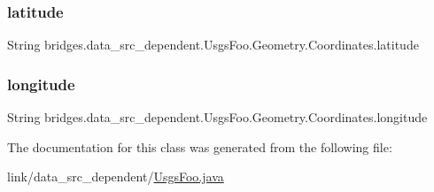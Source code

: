 \hypertarget{classbridges_1_1data__src__dependent_1_1_usgs_foo_1_1_geometry_1_1_coordinates_a8ab648886a19cd5d07f330e1558b8175}{}\label{classbridges_1_1data__src__dependent_1_1_usgs_foo_1_1_geometry_1_1_coordinates_a8ab648886a19cd5d07f330e1558b8175} 
\subsubsection{\texorpdfstring{latitude}{latitude}}
{\footnotesize\ttfamily String bridges.\+data\+\_\+src\+\_\+dependent.\+Usgs\+Foo.\+Geometry.\+Coordinates.\+latitude}

\hypertarget{classbridges_1_1data__src__dependent_1_1_usgs_foo_1_1_geometry_1_1_coordinates_a45f2a0dc4220eb4a1e8ec576101f9633}{}\label{classbridges_1_1data__src__dependent_1_1_usgs_foo_1_1_geometry_1_1_coordinates_a45f2a0dc4220eb4a1e8ec576101f9633} 
\subsubsection{\texorpdfstring{longitude}{longitude}}
{\footnotesize\ttfamily String bridges.\+data\+\_\+src\+\_\+dependent.\+Usgs\+Foo.\+Geometry.\+Coordinates.\+longitude}



The documentation for this class was generated from the following file\+:\begin{DoxyCompactItemize}
\item 
link/data\+\_\+src\+\_\+dependent/\hyperlink{_usgs_foo_8java}{Usgs\+Foo.\+java}\end{DoxyCompactItemize}
